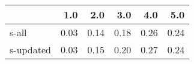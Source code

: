 \begin{tabular}{lrrrrr}
\toprule
{} &  1.0 &  2.0 &  3.0 &  4.0 &  5.0 \\
\midrule
s-all     & 0.03 & 0.14 & 0.18 & 0.26 & 0.24 \\
s-updated & 0.03 & 0.15 & 0.20 & 0.27 & 0.24 \\
\bottomrule
\end{tabular}
